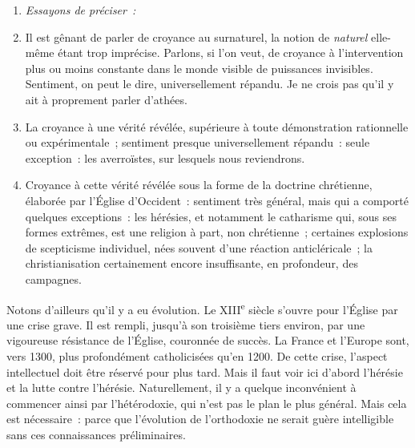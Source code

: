 \documentclass[french,twoside]{book} %
\newlength{\listmod}
\newcommand{\listhead}[1]{\hspace{-1\listmod}\emph{#1}}
\begin{document}
\begin{enumerate}[itemsep=0pt,]
\item[]\listhead{Essayons de préciser :}
\item Il est gênant de parler de croyance au surnaturel, la notion de \emph{naturel} elle-même étant trop imprécise. Parlons, si l’on veut, de croyance à l’intervention plus ou moins constante dans le monde visible de puissances invisibles. Sentiment, on peut le dire, universellement répandu. Je ne crois pas qu’il y ait à proprement parler d’athées.
\item La croyance à une vérité révélée, supérieure à toute démonstration rationnelle ou expérimentale ; sentiment presque universellement répandu : seule exception : les averroïstes, sur lesquels nous reviendrons.
\item Croyance à cette vérité révélée sous la forme de la doctrine chrétienne, élaborée par l’Église d’Occident : sentiment très général, mais qui a comporté quelques exceptions : les hérésies, et notamment le catharisme qui, sous ses formes extrêmes, est une religion à part, non chrétienne ; certaines explosions de scepticisme individuel, nées souvent d’une réaction anticléricale ; la christianisation certainement encore insuffisante, en profondeur, des campagnes.
\end{enumerate}

\noindent Notons d’ailleurs qu’il y a eu évolution. Le XIII\textsuperscript{e} siècle s’ouvre pour l’Église par une crise grave. Il est rempli, jusqu’à son troisième tiers environ, par une vigoureuse résistance de l’Église, couronnée de succès. La France et l’Europe sont, vers 1300, plus profondément catholicisées qu’en 1200. De cette crise, l’aspect intellectuel doit être réservé pour plus tard. Mais il faut voir ici d’abord l’hérésie et la lutte contre l’hérésie. Naturellement, il y a quelque inconvénient à commencer ainsi par l’hétérodoxie, qui n’est pas le plan le plus général. Mais cela est nécessaire : parce que l’évolution de l’orthodoxie ne serait guère intelligible sans ces connaissances préliminaires.
\end{document}

